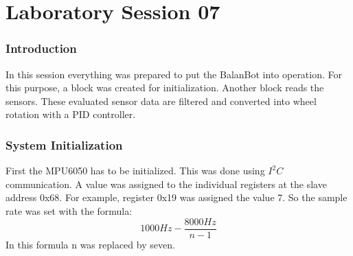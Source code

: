 \clearpage
\part{Laboratory Session 07}
\section{Introduction}
In this session everything was prepared to put the BalanBot into operation. For this purpose, a block was created for initialization. Another block reads the sensors. These evaluated sensor data are filtered and converted into wheel rotation with a PID controller.

\section{System Initialization}
First the MPU6050 has to be initialized. This was done using $I^2C$ communication.
A value was assigned to the individual registers at the slave address 0x68.
For example, register 0x19 was assigned the value 7. So the sample rate was set with the formula:\\
	\begin{equation}
		1000Hz - \frac{8000Hz}{n-1}
	\end{equation}
In this formula n was replaced by seven.	\\
\\

